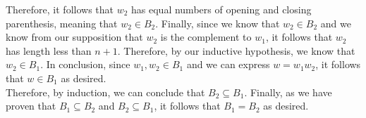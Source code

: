 \documentclass[11pt]{article}
\begin{document}
\begin{enumerate}
	 Therefore, it follows that $w_2$ has equal numbers of opening and closing parenthesis, meaning that $w_2 \in B_2$. Finally, since we know that $w_2 \in B_2$ and we know from our supposition that $w_2$ is the complement to $w_1$, it follows that $w_2$ has length less than $n+1$. Therefore, by our inductive hypothesis, we know that $w_2 \in B_1$. In conclusion, since $w_1, w_2 \in B_1$ and we can express $w = w_1w_2$, it follows that $w \in B_1$ as desired.\\
	 Therefore, by induction, we can conclude that $B_2 \subseteq B_1$. Finally, as we have proven that $B_1 \subseteq B_2$ and $B_2 \subseteq B_1$, it follows that $B_1 = B_2$ as desired.
\end{enumerate}
\end{document}
